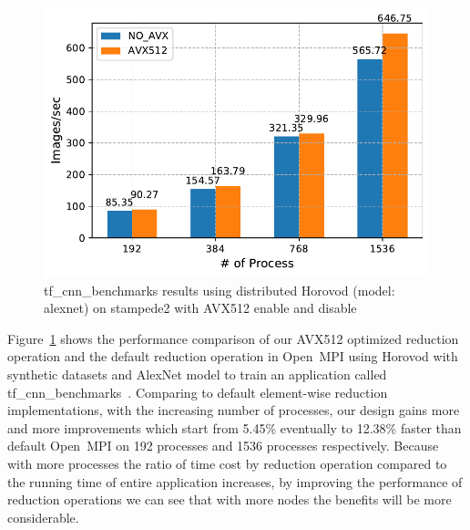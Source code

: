 \documentclass[sigconf]{acmart}
\newcommand{\ompi}[0]{Open~MPI\xspace}
\begin{document}
\begin{figure}[h]
    \centering
    \includegraphics[width=\linewidth]{horovod_tacc.pdf}
    \caption{tf\_cnn\_benchmarks results using distributed Horovod (model: alexnet) on stampede2 with AVX512 enable and disable}
    \label{fig:horovod_tacc}
\end{figure}
Figure~\ref{fig:horovod_tacc} shows the performance comparison of
our AVX512 optimized reduction operation and the default reduction operation in \ompi
using Horovod with synthetic datasets and AlexNet model to train an application called
tf\_cnn\_benchmarks~\cite{cnn_Tensorflow}.
Comparing to default element-wise reduction
implementations, with the increasing number of processes,
our design gains more and more improvements which start from 5.45\% eventually to 12.38\% faster than default \ompi on 192 processes and 1536 processes respectively.
Because with more processes the ratio of time cost by reduction operation compared to the running time of entire application increases, by improving the performance of reduction operations we can see that with more nodes the benefits will be more considerable.

\end{document}
